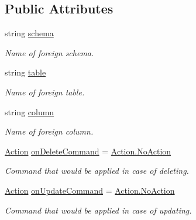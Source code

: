 \subsection*{Public Attributes}
\begin{DoxyCompactItemize}
\item 
string \mbox{\hyperlink{class_uniform_data_operator_1_1_sql_1_1_markup_1_1_is_foreign_key_attribute_a0ccdb7ac6c441bbba664d370aec645d1}{schema}}
\begin{DoxyCompactList}\small\item\em Name of foreign schema. \end{DoxyCompactList}\item 
string \mbox{\hyperlink{class_uniform_data_operator_1_1_sql_1_1_markup_1_1_is_foreign_key_attribute_ae210d1001824383251ca3ba1a0f3fd20}{table}}
\begin{DoxyCompactList}\small\item\em Name of foreign table. \end{DoxyCompactList}\item 
string \mbox{\hyperlink{class_uniform_data_operator_1_1_sql_1_1_markup_1_1_is_foreign_key_attribute_aa305b69f1eac8e7335b9776b5d30625e}{column}}
\begin{DoxyCompactList}\small\item\em Name of foreign column. \end{DoxyCompactList}\item 
\mbox{\hyperlink{class_uniform_data_operator_1_1_sql_1_1_markup_1_1_is_foreign_key_attribute_ae6c77deaf80d5c4d07709edf51eaebc5}{Action}} \mbox{\hyperlink{class_uniform_data_operator_1_1_sql_1_1_markup_1_1_is_foreign_key_attribute_a5055e5326f37afb695398139353139b2}{on\+Delete\+Command}} = \mbox{\hyperlink{class_uniform_data_operator_1_1_sql_1_1_markup_1_1_is_foreign_key_attribute_ae6c77deaf80d5c4d07709edf51eaebc5a1e601ea653db1c729c9ee5746730fabe}{Action.\+No\+Action}}
\begin{DoxyCompactList}\small\item\em Command that would be applied in case of deleting. \end{DoxyCompactList}\item 
\mbox{\hyperlink{class_uniform_data_operator_1_1_sql_1_1_markup_1_1_is_foreign_key_attribute_ae6c77deaf80d5c4d07709edf51eaebc5}{Action}} \mbox{\hyperlink{class_uniform_data_operator_1_1_sql_1_1_markup_1_1_is_foreign_key_attribute_a262baa0ebcc9ee448750f96019f0e14c}{on\+Update\+Command}} = \mbox{\hyperlink{class_uniform_data_operator_1_1_sql_1_1_markup_1_1_is_foreign_key_attribute_ae6c77deaf80d5c4d07709edf51eaebc5a1e601ea653db1c729c9ee5746730fabe}{Action.\+No\+Action}}
\begin{DoxyCompactList}\small\item\em Command that would be applied in case of updating. \end{DoxyCompactList}\end{DoxyCompactItemize}
